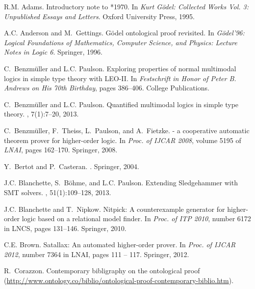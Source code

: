 \documentclass{easychair}
\begin{document}

%
\begin{thebibliography}{10}

R.M. Adams.
\newblock Introductory note to *1970.
\newblock In {\em {Kurt G\"odel: Collected Works Vol. 3: Unpublished Essays and
  Letters}}. Oxford University Press, 1995.

A.C. Anderson and M.~Gettings.
\newblock G\"odel ontological proof revisited.
\newblock In {\em {G\"odel'96: Logical Foundations of Mathematics, Computer
  Science, and Physics: Lecture Notes in Logic 6}}. {Springer}, 1996.

C.~Benzm{\"u}ller and L.C. Paulson.
\newblock Exploring properties of normal multimodal logics in simple type
  theory with {LEO-II}.
\newblock In {\em {Festschrift in Honor of {Peter B. Andrews} on His 70th
  Birthday}}, pages 386--406. College Publications.

C.~Benzm{\"u}ller and L.C. Paulson.
\newblock Quantified multimodal logics in simple type theory.
,
  7(1):7--20, 2013.

C.~Benzm{\"u}ller, F.~Theiss, L.~Paulson, and A.~Fietzke.
 - a cooperative automatic theorem prover for higher-order
  logic.
\newblock In {\em Proc. of IJCAR 2008}, volume 5195 of {\em LNAI}, pages
  162--170. Springer, 2008.

Y.~Bertot and P.~Casteran.
.
\newblock Springer, 2004.

J.C. Blanchette, S.~B\"ohme, and L.C. Paulson.
\newblock Extending {Sledgehammer} with {SMT} solvers.
, 51(1):109--128, 2013.

J.C. Blanchette and T.~Nipkow.
\newblock Nitpick: A counterexample generator for higher-order logic based on a
  relational model finder.
\newblock In {\em Proc. of ITP 2010}, number 6172 in LNCS, pages 131--146.
  Springer, 2010.

C.E. Brown.
\newblock Satallax: An automated higher-order prover.
\newblock In {\em Proc. of IJCAR 2012}, number 7364 in LNAI, pages 111 -- 117.
  Springer, 2012.

R.~Corazzon.
\newblock Contemporary bibligraphy on the ontological proof
  (\url{http://www.ontology.co/biblio/ontological-proof-contemporary-biblio.htm}).


\end{thebibliography}
\end{document}
